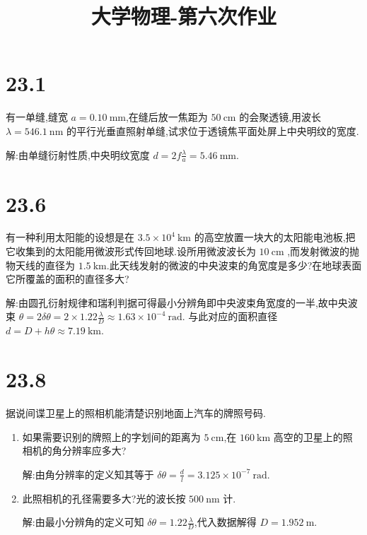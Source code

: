 
\usepackage{../../homeworks_preamble}
\title{大学物理-第六次作业}


    \maketitle
    \section{23.1} 有一单缝,缝宽 $a=0.10 \ \mathrm{mm}$,在缝后放一焦距为 $50 \ \mathrm{cm}$ 的会聚透镜,用波长 $\lambda = 546.1 \ \mathrm{ nm}$ 的平行光垂直照射单缝,试求位于透镜焦平面处屏上中央明纹的宽度.

    解:由单缝衍射性质,中央明纹宽度 $d=2f\frac{\lambda}{a}=5.46 \ \mathrm{mm}$.
    \section{23.6} 有一种利用太阳能的设想是在 $3.5\times 10^{4} \ \mathrm{km}$ 的高空放置一块大的太阳能电池板,把它收集到的太阳能用微波形式传回地球.设所用微波波长为 $10 \ \mathrm{cm}$ ,而发射微波的抛物天线的直径为 $1.5 \ \mathrm{ km}$.此天线发射的微波的中央波束的角宽度是多少?在地球表面它所覆盖的面积的直径多大?

    解:由圆孔衍射规律和瑞利判据可得最小分辨角即中央波束角宽度的一半,故中央波束 $\theta=2\delta \theta=2\times 1.22 \frac{\lambda}{D}\approx 1.63\times 10^{-4} \ \mathrm{ rad}$. 与此对应的面积直径 $d=D+h\theta\approx 7.19 \ \mathrm{km}$.
    \section{23.8} 据说间谍卫星上的照相机能清楚识别地面上汽车的牌照号码.
    \begin{enumerate}
        \item 如果需要识别的牌照上的字划间的距离为 $5 \ \mathrm{ cm}$,在 $160 \ \mathrm{ km}$ 高空的卫星上的照相机的角分辨率应多大?

            解:由角分辨率的定义知其等于 $\delta\theta=\frac{d}{l}=3.125\times 10^{-7} \ \mathrm{rad}$.
        \item 此照相机的孔径需要多大?光的波长按 $500 \ \mathrm{nm}$ 计.

            解:由最小分辨角的定义可知 $\delta\theta=1.22 \frac{\lambda}{D}$,代入数据解得 $D=1.952 \ \mathrm{m}$.
    \end{enumerate}
